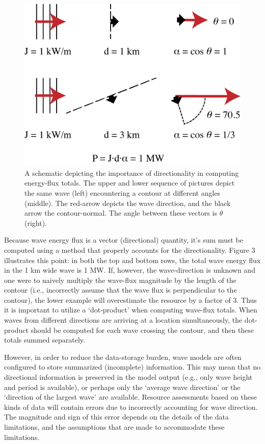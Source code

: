 \begin{figure}[ht]
  \centering
  \includegraphics[width=0.7\linewidth]{../diagram/Dot-Product_Schematic01}
  \caption{A schematic depicting the importance of directionality in computing energy-flux totals. The upper and lower sequence of pictures depict the same wave (left) encountering a contour at different angles (middle). The red-arrow depicts the wave direction, and the black arrow the contour-normal. The angle between these vectors is $\theta$ (right).}
  \label{fig:directionality}
\end{figure}

Because wave energy flux is a vector (directional) quantity, it’s sum must be computed using a method that properly accounts for the directionality. Figure 3 illustrates this point: in both the top and bottom rows, the total wave energy flux in the 1 km wide wave is 1 MW. If, however, the wave-direction is unknown and one were to naively multiply the wave-flux magnitude by the length of the contour (i.e., incorrectly assume that the wave flux is perpendicular to the contour), the lower example will overestimate the resource by a factor of 3. Thus it is important to utilize a ‘dot-product’ when computing wave-flux totals. When waves from different directions are arriving at a location simultaneously, the dot-product should be computed for each wave crossing the contour, and then these totals summed separately.

However, in order to reduce the data-storage burden, wave models are often configured to store summarized (incomplete) information. This may mean that no directional information is preserved in the model output (e.g., only wave height and period is available), or perhaps only the ‘average wave direction’ or the ‘direction of the largest wave’ are available. Resource assessments based on these kinds of data will contain errors due to incorrectly accounting for wave direction. The magnitude and sign of this error depends on the details of the data limitations, and the assumptions that are made to accommodate these limitations.

